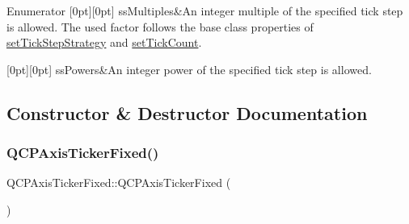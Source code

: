 \begin{DoxyEnumFields}{Enumerator}
[0pt][0pt]{}\mbox{\label{class_q_c_p_axis_ticker_fixed_a15b3d38b935d404b1311eb85cfb6a439a410f5c537f577b9dda33cb0152b756c6}} 
ss\+Multiples&An integer multiple of the specified tick step is allowed. The used factor follows the base class properties of \hyperlink{class_q_c_p_axis_ticker_a73b1d847c1a12159af6bfda4ebebe7d5}{set\+Tick\+Step\+Strategy} and \hyperlink{class_q_c_p_axis_ticker_a47752abba8293e6dc18491501ae34008}{set\+Tick\+Count}. \\
\hline

[0pt][0pt]{}\mbox{\label{class_q_c_p_axis_ticker_fixed_a15b3d38b935d404b1311eb85cfb6a439ab965e069729e3426a0b18c54a5ac6afd}} 
ss\+Powers&An integer power of the specified tick step is allowed. \\
\hline

\end{DoxyEnumFields}


\subsection{Constructor \& Destructor Documentation}
\mbox{\label{class_q_c_p_axis_ticker_fixed_a96d2b053a15f9b8e94550c3efeff6a34}} 
\subsubsection{\texorpdfstring{Q\+C\+P\+Axis\+Ticker\+Fixed()}{QCPAxisTickerFixed()}}
{\footnotesize\ttfamily Q\+C\+P\+Axis\+Ticker\+Fixed\+::\+Q\+C\+P\+Axis\+Ticker\+Fixed (\begin{DoxyParamCaption}{ }\end{DoxyParamCaption})}

